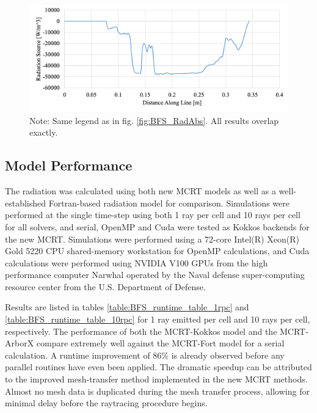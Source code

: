 \begin{figure}[!ht]
\includegraphics[width=\linewidth]{figures/ch4/LineComparison_RadSrc.png}
\caption{Note: Same legend as in fig. \ref{fig:BFS_RadAbs}. All results overlap exactly.}
\label{fig:BFS_RadSrc}
\end{figure}


\subsection{Model Performance}
The radiation was calculated using both new MCRT models as well as a well-established Fortran-based radiation model for comparison. Simulations were performed at the single time-step using both 1 ray per cell and 10 rays per cell for all solvers, and serial, OpenMP and Cuda were tested as Kokkos backends for the new MCRT. 
Simulations were performed using a 72-core Intel(R) Xeon(R) Gold 5220 CPU shared-memory workstation for OpenMP calculations, and Cuda calculations were performed using NVIDIA V100 GPUs from the high performance computer Narwhal operated by the Naval defense super-computing resource center from the U.S. Department of Defense.

Results are listed in tables \ref{table:BFS_runtime_table_1rpc} and \ref{table:BFS_runtime_table_10rpc} for 1 ray emitted per cell and 10 rays per cell, respectively. The performance of both the MCRT-Kokkos model and the MCRT-ArborX compare extremely well against the MCRT-Fort model for a serial calculation. A runtime improvement of 86\% is already observed before any parallel routines have even been applied.
The dramatic speedup can be attributed to the improved mesh-transfer method implemented in the new MCRT methods. 
Almost no mesh data is duplicated during the mesh transfer process, allowing for minimal delay before the raytracing procedure begins.

